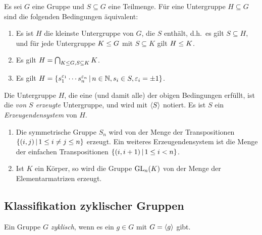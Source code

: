 Es sei $G$ eine Gruppe und $S \subseteq G$ eine Teilmenge.
Für eine Untergruppe $H \subseteq G$ sind die folgenden Bedingungen äquivalent:

\begin{enumerate}
  \item
    Es ist $H$ die kleinste Untergruppe von $G$, die $S$ enthält, d.h.\ es gilt $S \subseteq H$, und für jede Untergruppe $K \mathrel{\leq} G$ mit $S \subseteq K$ gilt $H \mathrel{\leq} K$.
  \item
    Es gilt $H = \bigcap_{K \mathrel{\leq} G, S \subseteq K} K$.
  \item
    Es gilt
    $
        H
      = \{
          s_1^{\varepsilon_1} \dotsm s_n^{\varepsilon_n}
        \suchthat
          n \in \Natural,
          s_i \in S,
          \varepsilon_i = \pm 1
        \}
    $.
\end{enumerate}

\begin{definition}
  Die Untergruppe $H$, die eine \textup(und damit alle\textup) der obigen Bedingungen erfüllt, ist die \emph{von $S$ erzeugte} Untergruppe, und wird mit $\langle S\rangle$ notiert.
  Es ist $S$ ein \emph{Erzeugendensystem} von $H$.
\end{definition}

\begin{example}
  \begin{enumerate}
    \item
      Die symmetrische Gruppe $S_n$ wird von der Menge der Transpositionen $\{ (i, j) \suchthat 1 \leq i \neq j \leq n \}$ erzeugt.
      Ein weiteres Erzeugendensystem ist die Menge der einfachen Transpositionen $\{ (i, i+1) \suchthat 1 \leq i < n \}$.
    \item
      Ist $K$ ein Körper, so wird die Gruppe $\operatorname{GL}_{n}(K)$ von der Menge der Elementarmatrizen erzeugt.
  \end{enumerate}
\end{example}



\subsection{Klassifikation zyklischer Gruppen}

\begin{definition}
  Ein Gruppe $G$ \emph{zyklisch}, wenn es ein $g \in G$ mit $G = \langle g\rangle$ gibt.
\end{definition}

